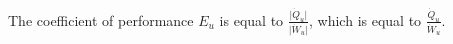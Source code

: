 The coefficient of performance \( E_u \) is equal to \( \frac{\lvert \dot{Q}_u \rvert}{\lvert \dot{W}_u \rvert} \), which is equal to \( \frac{\dot{Q}_u}{\dot{W}_u} \).